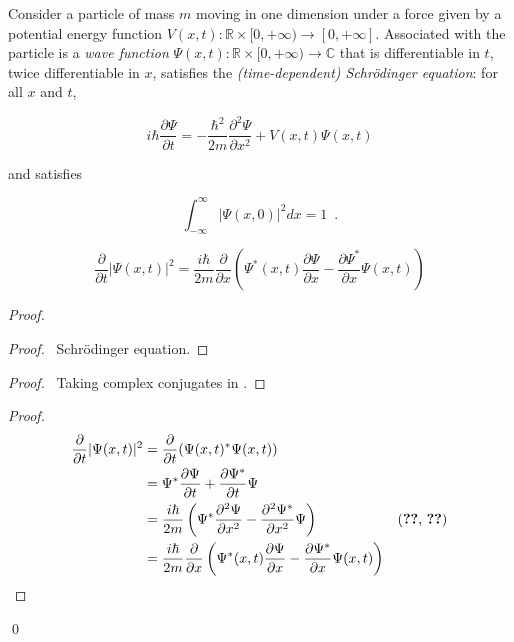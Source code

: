 Consider a particle of mass $m$ moving in one dimension under a force given by a potential energy function $V(x,t) : \mathbb{R} \times [0,+\infty) \rightarrow [0, + \infty]$. Associated with the particle is a \emph{wave function} $\Psi(x,t) : \mathbb{R} \times [0,+\infty) \rightarrow \mathbb{C}$ that is differentiable in $t$, twice differentiable in $x$, satisfies the \emph{(time-dependent) Schr\"{o}dinger equation}: for all $x$ and $t$,

\[ i \hbar \frac{\partial \Psi}{\partial t} = - \frac{\hbar^2}{2 m} \frac{\partial^2 \Psi}{\partial x^2} + V(x,t) \Psi(x,t) \]

and satisfies

\[ \int_{- \infty}^\infty |\Psi(x,0)|^2 dx = 1 \enspace . \]

\begin{prop}
\label{prop:differentiate_psi_squared}
\[ \frac{\partial}{\partial t} |\Psi(x,t)|^2 = \frac{i \hbar}{2m} \frac{\partial}{\partial x} \left(
\Psi^*(x,t) \frac{\partial \Psi}{\partial x} - \frac{\partial \Psi^*}{\partial x} \Psi(x,t) \right) \]
\end{prop}

\begin{proof}
\pf
{}
\begin{proof}
	\pf\ Schr\"{o}dinger equation.
\end{proof}
\begin{proof}
	\pf\ Taking complex conjugates in .
\end{proof}
\begin{proof}
	\pf
	\begin{align*}
		\frac{\partial}{\partial t} |\Psi(x,t)|^2
		& = \frac{\partial}{\partial t} (\Psi(x,t)^* \Psi(x,t)) \\
		& = \Psi^* \frac{\partial \Psi}{\partial t} + \frac{\partial \Psi^*}{\partial t} \Psi \\
		& = \frac{i \hbar}{2m} \left( \Psi^* \frac{\partial^2 \Psi}{\partial x^2} - \frac{\partial^2 \Psi^*}{\partial x^2} \Psi \right) & (\text{\stepref{1}, \stepref{2}}) \\
		& = \frac{i \hbar}{2m} \frac{\partial}{\partial x} \left(
\Psi^*(x,t) \frac{\partial \Psi}{\partial x} - \frac{\partial \Psi^*}{\partial x} \Psi(x,t) \right)
	\end{align*}
\end{proof}
\qed
\end{proof}

